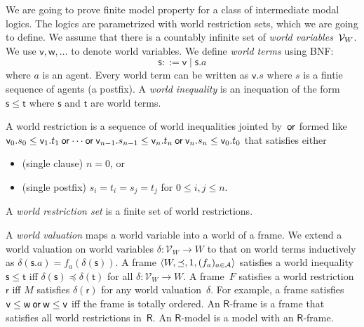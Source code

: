 We are going to prove finite model property for a class of
intermediate modal logics.  The logics are parametrized with
world restriction sets,  which we are going to define.
We assume that there is a countably infinite set of \textit{world
variables}~$\mathcal V_W$.
We use $\mathsf v, \mathsf w,\ldots$ to denote world variables.
We define \textit{world terms} using BNF:
\[
 \mathsf s::=\mathsf v\mid \mathsf s.a
\]
where $a$ is an agent.
Every world term can be written as $\mathsf v.s$ where $s$ is a fintie sequence
of agents (a postfix).
A \textit{world inequality} is an inequation of the form $\mathsf s\le
\mathsf t$ where $\mathsf s$ and $\mathsf t$ are world terms.
\begin{definition}
A world restriction is a sequence of world inequalities jointed
 by~$\mathbin{\mathsf{or}}$ formed like
 $\mathsf v_0.s_0\le\mathsf v_1.t_1\mathbin{\mathsf{or}}\cdots\mathbin{\mathsf{or}}
 \mathsf v_{n-1}.s_{n-1}\le\mathsf v_n.t_n\mathbin{\mathsf{or}} \mathsf v_n.s_n\le\mathsf
 v_0.t_0$ that satisfies either
 \begin{itemize}
  \item (single clause) $n=0$, or
  \item (single postfix) $s_i = t_i = s_j = t_{j}$ for $0\le i,j\le n$.
 \end{itemize}
\end{definition}
A \textit{world restriction set} is a finite set of world restrictions.

A \textit{world valuation} maps a world variable into a world of a frame.
We extend a world valuation on world variables
$\delta\colon\mathcal V_W\rightarrow W$ to that on world terms
inductively as $\delta(\mathsf s.a)=f_a(\delta(\mathsf s))$.
A frame $\langle{W,\preceq, 1,(f_a)_{a\in\mathcal A}}\rangle$ satisfies a world inequality
$\mathsf s\le\mathsf t$ iff $\delta(\mathsf s)\preceq \delta(\mathsf t)$
for all $\delta\colon\mathcal V_W\rightarrow W$.
A frame~$F$ satisfies a world restriction $\mathsf r$
iff $M$ satisfies $\delta(\mathsf r)$ for any world valuation~$\delta$.
For example, a frame satisfies $\mathsf v\le \mathsf w\mathbin{\mathsf{or}}\mathsf
w\le\mathsf v$ iff the frame is totally ordered.
An $\mathsf R$-frame is a frame that
satisfies all world restrictions in~$\mathsf R$.
An $\mathsf R$-model is a model with an $\mathsf R$-frame.


